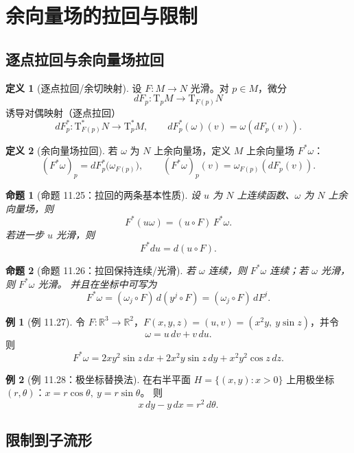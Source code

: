 \documentclass[12pt,a4paper]{article}
\theoremstyle{definition}
\newtheorem{definition}{定义}[section]
\newtheorem{example}{例}[section]
\theoremstyle{plain}
\newtheorem{proposition}{命题}[section]
\newcommand{\R}{\mathbb{R}}
\newcommand{\Tp}[1]{\mathrm{T}_{#1}}
\newcommand{\Tps}[1]{\mathrm{T}^{*}_{#1}}
\begin{document}
\section{余向量场的拉回与限制}

\subsection{逐点拉回与余向量场拉回}

\begin{definition}[逐点拉回/余切映射]
设 $F:M\to N$ 光滑。对 $p\in M$，微分
\[
dF_p:\Tp{p}M\to \Tp{F(p)}N
\]
诱导对偶映射（逐点拉回）
\[
dF_p^*:\Tps{F(p)}N\to \Tps{p}M,\qquad dF_p^*(\omega)(v)=\omega(dF_p(v)).
\]
\end{definition}

\begin{definition}[余向量场拉回]
若 $\omega$ 为 $N$ 上余向量场，定义 $M$ 上余向量场 $F^*\omega$：
\[
(F^*\omega)_p = dF_p^*\big(\omega_{F(p)}\big),\qquad
(F^*\omega)_p(v)=\omega_{F(p)}(dF_p(v)).
\]
\end{definition}

\begin{proposition}[命题 11.25：拉回的两条基本性质]
设 $u$ 为 $N$ 上连续函数、$\omega$ 为 $N$ 上余向量场，则
\[
F^*(u\omega)=(u\circ F)\,F^*\omega.
\]
若进一步 $u$ 光滑，则
\[
F^*du = d(u\circ F).
\]
\end{proposition}

\begin{proposition}[命题 11.26：拉回保持连续/光滑]
若 $\omega$ 连续，则 $F^*\omega$ 连续；若 $\omega$ 光滑，则 $F^*\omega$ 光滑。
并且在坐标中可写为
\[
F^*\omega=(\omega_j\circ F)\,d(y^j\circ F)=(\omega_j\circ F)\,dF^j.
\]
\end{proposition}

\begin{example}[例 11.27]
令 $F:\R^3\to\R^2$，$F(x,y,z)=(u,v)=(x^2y,\ y\sin z)$，并令
\[
\omega=u\,dv+v\,du.
\]
则
\[
F^*\omega
=2xy^2\sin z\,dx+2x^2y\sin z\,dy+x^2y^2\cos z\,dz.
\]
\end{example}

\begin{example}[例 11.28：极坐标替换法]
在右半平面 $H=\{(x,y):x>0\}$ 上用极坐标 $(r,\theta)$：$x=r\cos\theta,\ y=r\sin\theta$。
则
\[
x\,dy-y\,dx = r^2\,d\theta.
\]
\end{example}

\subsection{限制到子流形}
\end{document}
